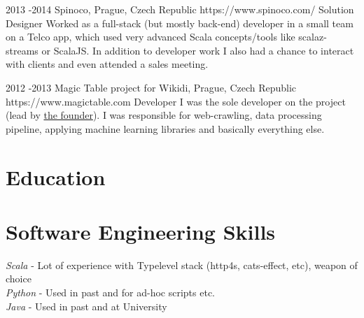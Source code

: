 \documentclass[10pt]{article} %
\begin{document}

\job
{2013 -}{2014 }
{Spinoco, Prague, Czech Republic}
{https://www.spinoco.com/}
{Solution Designer}
{Worked as a full-stack (but mostly back-end) developer in a small team on a Telco app, which used very advanced Scala concepts/tools like scalaz-streams or ScalaJS. In addition to developer work I also had a chance to interact with clients and even attended a sales meeting.\\
}


\job
{2012 -}{2013}
{Magic Table project for Wikidi, Prague, Czech Republic}
{https://www.magictable.com}
{Developer}
{I was the sole developer on the project (lead by \href{https://michal.illich.cz/}{the founder}). I was responsible for web-crawling, data processing pipeline, applying machine learning libraries and basically everything else. \\
}



\section{Education}



\section{Software Engineering Skills}

{
\textit{Scala} - Lot of experience with Typelevel stack (http4s, cats-effect, etc), weapon of choice\\
\textit{Python} - Used in past and for ad-hoc scripts etc.\\
\textit{Java} - Used in past and at University\\
}
\end{document}

